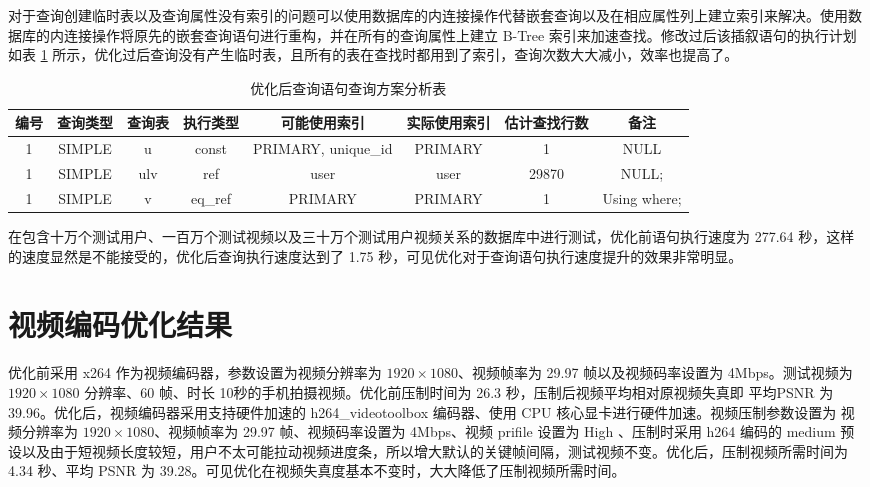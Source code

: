 对于查询创建临时表以及查询属性没有索引的问题可以使用数据库的内连接操作代替嵌套查询以及在相应属性列上建立索引来解决。使用数据库的内连接操作将原先的嵌套查询语句进行重构，并在所有的查询属性上建立 B-Tree 索引来加速查找。修改过后该插叙语句的执行计划如表 \ref{tab:af_explain} 所示，优化过后查询没有产生临时表，且所有的表在查找时都用到了索引，查询次数大大减小，效率也提高了。

\begin{table}[!ht]
    \centering
    \caption{优化后查询语句查询方案分析表}
	\label{tab:af_explain}
	\small
    \begin{tabularx}{\textwidth}{cccccccc}
    \toprule
    编号 & 查询类型 & 查询表 & 执行类型 & 可能使用索引 & 实际使用索引 & 估计查找行数 & 备注  \\ \midrule
    1 & SIMPLE & u & const & PRIMARY, unique\_id & PRIMARY & 1 & NULL \\
    1 & SIMPLE & ulv & ref & user & user & 29870 & NULL; \\ 
    1 & SIMPLE & v & eq\_ref & PRIMARY & PRIMARY & 1 & Using where; \\ \bottomrule
    \end{tabularx}
\end{table}


在包含十万个测试用户、一百万个测试视频以及三十万个测试用户视频关系的数据库中进行测试，优化前语句执行速度为 277.64 秒，这样的速度显然是不能接受的，优化后查询执行速度达到了 1.75 秒，可见优化对于查询语句执行速度提升的效果非常明显。


\section{视频编码优化结果}
优化前采用 x264 作为视频编码器，参数设置为视频分辨率为 $1920\times1080$、视频帧率为 29.97 帧以及视频码率设置为 4Mbps。测试视频为 $1920\times1080$ 分辨率、60 帧、时长 10秒的手机拍摄视频。优化前压制时间为 26.3 秒，压制后视频平均相对原视频失真即 平均PSNR 为 39.96。优化后，视频编码器采用支持硬件加速的 h264\_videotoolbox 编码器、使用 CPU 核心显卡进行硬件加速。视频压制参数设置为 视频分辨率为 $1920\times1080$、视频帧率为 29.97 帧、视频码率设置为 4Mbps、视频 prifile 设置为 High 、压制时采用 h264 编码的 medium 预设以及由于短视频长度较短，用户不太可能拉动视频进度条，所以增大默认的关键帧间隔，测试视频不变。优化后，压制视频所需时间为 4.34 秒、平均 PSNR 为 39.28。可见优化在视频失真度基本不变时，大大降低了压制视频所需时间。

